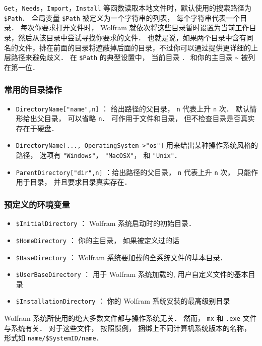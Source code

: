 \verb`Get`，\verb`Needs`，\verb`Import`，\verb`Install` 等函数读取本地文件时，默认使用的搜索路径为 \verb`$Path`．
全局变量 \verb`$Path` 被定义为一个字符串的列表， 每个字符串代表一个目录．
每次你要求打开文件时， Wolfram 就依次将这些目录暂时设置为当前工作目录，然后从该目录中尝试寻找你要求的文件．
也就是说，如果两个目录中含有同名的文件，排在前面的目录将遮蔽掉后面的目录，不过你可以通过提供更详细的上层路径来避免歧义．
在 \verb`$Path` 的典型设置中， 当前目录 \verb`．` 和你的主目录 \verb`~` 被列在第一位．

\subsubsection{常用的目录操作}

\begin{itemize}
\item \verb`DirectoryName["name",n]` ： 给出路径的父目录， \verb`n` 代表上升 \verb`n` 次． 
默认情形给出父目录， 可以省略 \verb`n`． 可作用于文件和目录， 但不检查目录是否真实存在于硬盘．
\item \verb`DirectoryName[..., OperatingSystem->"os"]` 用来给出某种操作系统风格的路径， 
选项有 \verb`"Windows"`， \verb`"MacOSX"`， 和 \verb`"Unix"`．
\item \verb`ParentDirectory["dir",n]` ：给出路径的父目录， \verb`n` 代表上升 \verb`n` 次， 
只能作用于目录， 并且要求目录真实存在．
\end{itemize}

\subsubsection{预定义的环境变量}

\begin{itemize}
\item \verb`$InitialDirectory` ： Wolfram 系统启动时的初始目录．
\item \verb`$HomeDirectory` ：  你的主目录， 如果被定义过的话
\item \verb`$BaseDirectory` ：  Wolfram 系统要加载的全系统文件的基本目录．
\item \verb`$UserBaseDirectory` ：  用于 Wolfram 系统加载的, 用户自定义文件的基本目录
\item \verb`$InstallationDirectory` ：  你的 Wolfram 系统安装的最高级别目录
\end{itemize}

Wolfram 系统所使用的绝大多数文件都与操作系统无关． 然而， \verb`mx` 和 \verb`.exe` 文件与系统有关．
对于这些文件， 按照惯例， 捆绑上不同计算机系统版本的名称， 形式如 \verb`name/$SystemID/name`．

